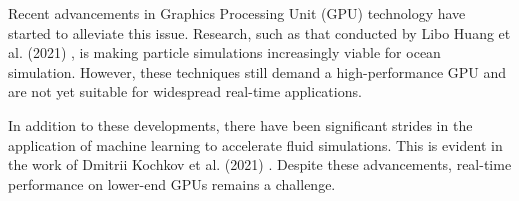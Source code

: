 Recent advancements in Graphics Processing Unit (GPU) technology have started to alleviate this issue. Research, such as that conducted by Libo Huang et al. (2021) \cite{huang2021}, is making particle simulations increasingly viable for ocean simulation. However, these techniques still demand a high-performance GPU and are not yet suitable for widespread real-time applications.

In addition to these developments, there have been significant strides in the application of machine learning to accelerate fluid simulations. This is evident in the work of Dmitrii Kochkov et al. (2021) \cite{kochkov2021machine}. Despite these advancements, real-time performance on lower-end GPUs remains a challenge.









